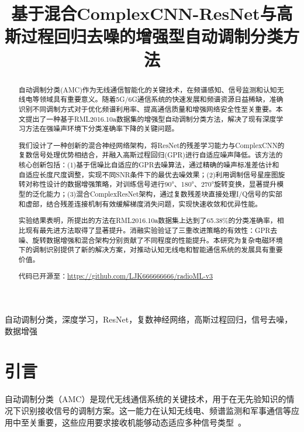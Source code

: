 \documentclass[conference]{IEEEtran}
\begin{document}
\title{基于混合ComplexCNN-ResNet与高斯过程回归去噪的增强型自动调制分类方法}

\author{
}

\maketitle

\begin{abstract}
自动调制分类(AMC)作为无线通信智能化的关键技术，在频谱感知、信号监测和认知无线电等领域具有重要意义。随着5G/6G通信系统的快速发展和频谱资源日益稀缺，准确识别不同调制方式对于优化频谱利用率、提高通信质量和增强网络安全性至关重要。本文提出了一种基于RML2016.10a数据集的增强型自动调制分类方法，解决了现有深度学习方法在强噪声环境下分类准确率下降的关键问题。

我们设计了一种创新的混合神经网络架构，将ResNet的残差学习能力与ComplexCNN的复数信号处理优势相结合，并融入高斯过程回归(GPR)进行自适应噪声降低。该方法的核心创新包括：(1)基于信噪比自适应的GPR去噪算法，通过精确的噪声标准差估计和自适应长度尺度调整，实现不同SNR条件下的最优去噪效果；(2)利用调制信号星座图旋转对称性设计的数据增强策略，对训练信号进行90°、180°、270°旋转变换，显著提升模型的泛化能力；(3)混合ComplexResNet架构，通过复数残差块直接处理I/Q信号的实部和虚部，结合残差连接机制有效缓解梯度消失问题，实现快速收敛和优异性能。

实验结果表明，所提出的方法在RML2016.10a数据集上达到了65.38\%的分类准确率，相比现有最先进方法取得了显著提升。消融实验验证了三重改进策略的有效性：GPR去噪、旋转数据增强和混合架构分别贡献了不同程度的性能提升。本研究为复杂电磁环境下的调制识别提供了新的解决方案，对推动认知无线电和智能通信系统的发展具有重要价值。

代码已开源至：\url{https://github.com/LJK666666666/radioML-v3}
\end{abstract}

\begin{IEEEkeywords}
自动调制分类，深度学习，ResNet，复数神经网络，高斯过程回归，信号去噪，数据增强
\end{IEEEkeywords}


\section{引言}
自动调制分类（AMC）是现代无线通信系统的关键技术，用于在无先验知识的情况下识别接收信号的调制方案。这一能力在认知无线电、频谱监测和军事通信等应用中至关重要，这些应用要求接收机能够动态适应多种信号类型~\cite{dobre2007survey}。
\end{document}
